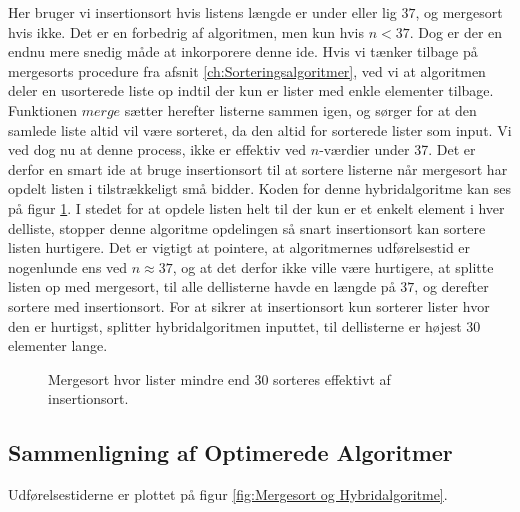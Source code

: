 Her bruger vi insertionsort hvis listens længde er under eller lig $37$, og mergesort hvis ikke. Det er en forbedrig af algoritmen, men kun hvis $n < 37$. Dog er der en endnu mere snedig måde at inkorporere denne ide. Hvis vi tænker tilbage på mergesorts procedure fra afsnit \ref{ch:Sorteringsalgoritmer}, ved vi at algoritmen deler en usorterede liste op indtil der kun er lister med enkle elementer tilbage. Funktionen $merge$ sætter herefter listerne sammen igen, og sørger for at den samlede liste altid vil være sorteret, da den altid for sorterede lister som input. Vi ved dog nu at denne process, ikke er effektiv ved $n$-værdier under 37. Det er derfor en smart ide at bruge insertionsort til at sortere listerne når mergesort har opdelt listen i tilstrækkeligt små bidder. Koden for denne hybridalgoritme kan ses på figur \ref{fig:hybridalgoritme i Python}. I stedet for at opdele listen helt til der kun er et enkelt element i hver delliste, stopper denne algoritme opdelingen så snart insertionsort kan sortere listen hurtigere. Det er vigtigt at pointere, at algoritmernes udførelsestid er nogenlunde ens ved $n \approx 37$, og at det derfor ikke ville være hurtigere, at splitte listen op med mergesort, til alle dellisterne havde en længde på $37$, og derefter sortere med insertionsort. For at sikrer at insertionsort kun sorterer lister hvor den er hurtigst, splitter hybridalgoritmen inputtet, til dellisterne er højest $30$ elementer lange.


\begin{figure}
	\begin{center}
		
	\end{center}
	\caption{Mergesort hvor lister mindre end 30 sorteres effektivt af insertionsort.}
	\label{fig:hybridalgoritme i Python}
\end{figure}







\subsection{Sammenligning af Optimerede Algoritmer}%
\label{sub:Sammenligning af Optimerede Algoritmer}

Udførelsestiderne er plottet på figur \ref{fig:Mergesort og Hybridalgoritme}.\\

